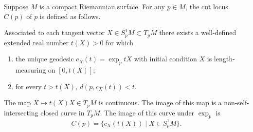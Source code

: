 Suppose $M$ is a compact Riemannian surface. For any $p \in M$, the cut locus $C(p)$ of $p$ is defined as follows.

Associated to each tangent vector $X \in S_p^1 M \subset T_p M$ there exists a well-defined extended real number $t(X) > 0$ for which

\begin{enumerate}
  \item[(a)] the unique geodesic $c_X(t) = \exp_p tX$ with initial condition $X$ is length-measuring on $[0, t(X)]$;
  \item[(b)] for every $t > t(X)$, $d(p, c_X(t)) < t$.
\end{enumerate}

The map $X \mapsto t(X)X \in T_p M$ is continuous. The image of this map is a non-self-intersecting closed curve in $T_p M$. The image of this curve under $\exp_p$ is
$$C(p) = \{ c_X(t(X)) \mid X \in S_p^1 M \}.$$
